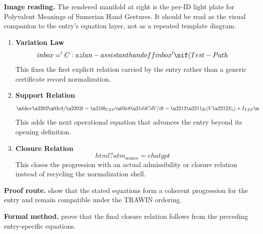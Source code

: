 \begin{samepage}
\noindent\begin{minipage}[t]{0.45\linewidth}
\vspace{0pt}
\raggedright
\scriptsize\textbf{Image reading.} The rendered manifold at right is the per-ID light plate for Polyvalent Meanings of Sumerian Hand Gestures. It should be read as the visual companion to the entry's equation layer, not as a repeated template diagram.\par
\end{minipage}\hfill
\begin{minipage}[t]{0.53\linewidth}
\vspace*{-0.10in}
\raggedright
{}
\end{minipage}
\end{samepage}

\clearpage


\begin{enumerate}[leftmargin=1.6em,itemsep=9pt,topsep=6pt]
\item \textbf{Variation Law}
\[
inbox='C:\\azlan-assistant\\handoff\\inbox'\nif (Test-Path
\]
This fixes the first explicit relation carried by the entry rather than a generic certificate record normalization.

\item \textbf{Support Relation}
\[
\n \\hbar \u2202\u03c8/\u2202t = \u210b_{TZP} \u03c8 \u21d4 C dV/dt = \u2212\u2211g_i(V\u2212E_i)+I_{TZP}\n \
\]
This adds the next operational equation that advances the entry beyond its opening definition.

\item \textbf{Closure Relation}
\[
html?utm_{\mathrm{source}}=chatgpt
\]
This closes the progression with an actual admissibility or closure relation instead of recycling the normalization shell.
\end{enumerate}

\textbf{Proof route.} show that the stated equations form a coherent progression for the entry and remain compatible under the TRAWIN ordering.

\textbf{Formal method.} prove that the final closure relation follows from the preceding entry-specific equations.

